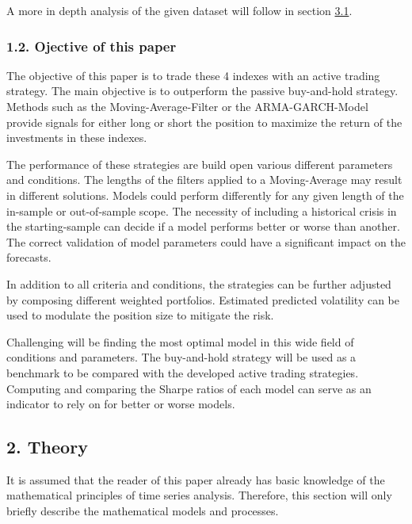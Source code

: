\documentclass[
]{article}
\begin{document}
A more in depth analysis of the given dataset will follow in section
\protect\hyperlink{ts-analysis}{3.1}.

\hypertarget{ojective-of-this-paper}{%
\subsubsection{1.2. Ojective of this
paper}\label{ojective-of-this-paper}}

The objective of this paper is to trade these 4 indexes with an active
trading strategy. The main objective is to outperform the passive
buy-and-hold strategy. Methods such as the Moving-Average-Filter or the
ARMA-GARCH-Model provide signals for either long or short the position
to maximize the return of the investments in these indexes.

The performance of these strategies are build open various different
parameters and conditions. The lengths of the filters applied to a
Moving-Average may result in different solutions. Models could perform
differently for any given length of the in-sample or out-of-sample
scope. The necessity of including a historical crisis in the
starting-sample can decide if a model performs better or worse than
another. The correct validation of model parameters could have a
significant impact on the forecasts.

In addition to all criteria and conditions, the strategies can be
further adjusted by composing different weighted portfolios. Estimated
predicted volatility can be used to modulate the position size to
mitigate the risk.

Challenging will be finding the most optimal model in this wide field of
conditions and parameters. The buy-and-hold strategy will be used as a
benchmark to be compared with the developed active trading strategies.
Computing and comparing the Sharpe ratios of each model can serve as an
indicator to rely on for better or worse models.

\newpage

\hypertarget{theory}{%
\subsection{2. Theory}\label{theory}}

It is assumed that the reader of this paper already has basic knowledge
of the mathematical principles of time series analysis. Therefore, this
section will only briefly describe the mathematical models and
processes.
\end{document}
